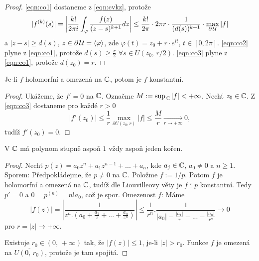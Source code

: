 \begin{proof}
\cref{eqn:co1} dostaneme z \cref{eqn:cvkz}, protože 
\[|f^{(k)}(s)|=
\left\lvert\frac{k!}{2\pi{i}}\int_\varphi{\frac{f(z)}{(z-s)^{k+1}}}dz\right\lvert\leq
\frac{k!}{2\pi}\cdot 2\pi{r}\cdot\frac{1}{(d(s))^{k+1}}\cdot \max_{\partial\operatorname{\mathcal{U}} }{|f|}\]
a $|z-s|\geq d(s)$, $z\in\partial\operatorname{\mathcal{U}} =\langle\varphi\rangle$, 
zde $\varphi(t)=z_0+r\cdot e^{it}$, $t\in\left[0, 2\pi\right]$.\newline
\cref{eqn:co2} plyne z \cref{eqn:co1}, protože $d(s)\geq\frac{r}{2}$ $\forall{s\in{U(z_0,\, r/2)}}$.\newline
\cref{eqn:co3} plyne z \cref{eqn:co1}, protože $d(z_0)=r$. 
\end{proof}


\begin{theorem}[Liouville] \label{thm:liouville}
Je-li $f$ holomorfní  a omezená na $\operatorname{\mathbb{C}}  $, potom je $f$ konstantní.
\end{theorem}

\begin{proof}
Ukážeme, že $f'=0$ na $\operatorname{\mathbb{C}}$. 
Označme $M:=\sup_{\,\operatorname{\mathbb{C}}}{|f|}<+\infty$. Nechť $z_0\in\operatorname{\mathbb{C}}$. Z \cref{eqn:co3} dostaneme pro každé $r>0$
\[|f'(z_0)|\leq
\frac{1}{r}\max_{\partial{U(z_0,r)}}{|f|}\leq
\frac{M}{r}\underset{{r\to{+\infty}}}{\to}0,\]
tudíž $f'(z_0)=0$.
\end{proof}

\begin{consequence}
V $\operatorname{\mathbb{C}}  $ má polynom stupně aspoň $1$ vždy aspoň jeden kořen.
\end{consequence}

\begin{proof}
Nechť $p(z)={a_0}{z^n}+{a_1}{z^{n-1}}+...+{a_n}$, kde $a_j\in\operatorname{\mathbb{C}}  $, $a_0\neq{0}$ a $n\geq{1}$.\newline
Sporem: Předpokládejme, že $p\neq{0}$ na $\operatorname{\mathbb{C}}  $. Položme $f:=1/p$. Potom $f$ je holomorfní a omezená na $\operatorname{\mathbb{C}}  $, tudíž dle Liouvilleovy věty je $f$ i $p$ konstantní. Tedy $p'=0$ a $0=p^{(n)}=n!{a_0}$, což je spor.\newline
Omezenost $f$: Máme
\[|f(z)|=\left\lvert\frac{1}{z^n.\left(a_0+\frac{a_1}{z}+...+\frac{a_n}{z^n}\right)}\right\lvert\leq
\frac{1}{r^n}.\frac{1}{|a_0|-\frac{|a_1|}{r}-...-\frac{|a_n|}{r^n}}\longrightarrow 0\]
pro $r=|z|\to+\infty$.

Existuje $r_0\in(0,\, +\infty)$ tak, že $|f(z)|\leq{1}$, je-li $|z|>r_0$. Funkce $f$ je omezená na $\overline{U(0,\, r_0)}$, protože je tam spojitá.
\end{proof}

